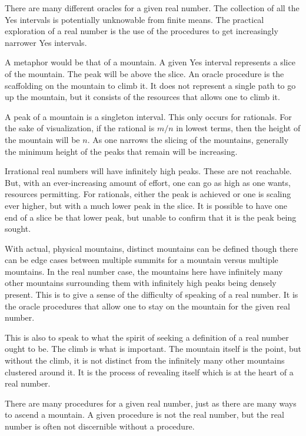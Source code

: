 \documentclass[12pt]{article}
\begin{document}
There are many different oracles for a given real number. The collection of all the Yes intervals is potentially unknowable from finite means. The practical exploration of a real number is the use of the procedures to get increasingly narrower Yes intervals.  

A metaphor would be that of a mountain. A given Yes interval represents a slice of the mountain. The peak will be above the slice. An oracle procedure is the scaffolding on the mountain to climb it. It does not represent a single path to go up the mountain, but it consists of the resources that allows one to climb it. 

A peak of a mountain is a singleton interval. This only occurs for rationals. For the sake of visualization, if the rational is $m/n$ in lowest terms, then the height of the mountain will be $n$. As one narrows the slicing of the mountains, generally the minimum height of the peaks that remain will be increasing. 

Irrational real numbers will have infinitely high peaks. These are not reachable. But, with an ever-increasing amount of effort, one can go as high as one wants, resources permitting. For rationals, either the peak is achieved or one is scaling ever higher, but with a much lower peak in the slice. It is possible to have one end of a slice be that lower peak, but unable to confirm that it is the peak being sought. 

With actual, physical mountains, distinct mountains can be defined though there can be edge cases between multiple summits for a mountain versus multiple mountains. In the real number case, the mountains here have infinitely many other mountains surrounding them with infinitely high peaks being densely present. This is to give a sense of the difficulty of speaking of a real number. It is the oracle procedures that allow one to stay on the mountain for the given real number. 

This is also to speak to what the spirit of seeking a definition of a real number ought to be. The climb is what is important. The mountain itself is the point, but without the climb, it is not distinct from the infinitely many other mountains clustered around it. It is the process of revealing itself which is at the heart of a real number. 

There are many procedures for a given real number, just as there are many ways to ascend a mountain. A given procedure is not the real number, but the real number is often not discernible without a procedure. 
\end{document}
